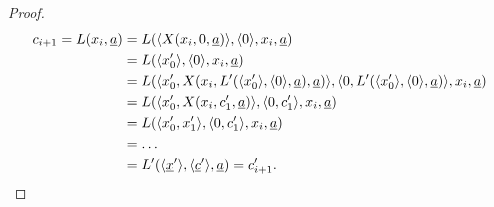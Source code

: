 \begin{proof}
\begin{align*}
c_{i+1}=L(x_i,\underline a)&=L(\langle X(x_i,0,\underline a)\rangle,\langle0\rangle,x_i,\underline a)\\
&=L(\langle x'_0\rangle,\langle0\rangle,x_i,\underline a)\\
&=L(\langle x'_0,  X(x_i,   L'(\langle x'_0\rangle,\langle0\rangle,\underline a)    ,\underline a)\rangle,\langle0, 
     L'(\langle x'_0\rangle,\langle0\rangle,\underline a)  \rangle,x_i,\underline a)\\
&=L(\langle x'_0,  X(x_i,   c'_1    ,\underline a)\rangle,\langle0, 
     c'_1  \rangle,x_i,\underline a)\\
&=L(\langle x'_0,  x'_1\rangle,\langle0, 
     c'_1  \rangle,x_i,\underline a)\\
&=\ldots\\
&=L'(\langle\underline x'\rangle,\langle\underline c'\rangle, \underline a)=c'_{i+1}.
\end{align*}

\end{proof}

